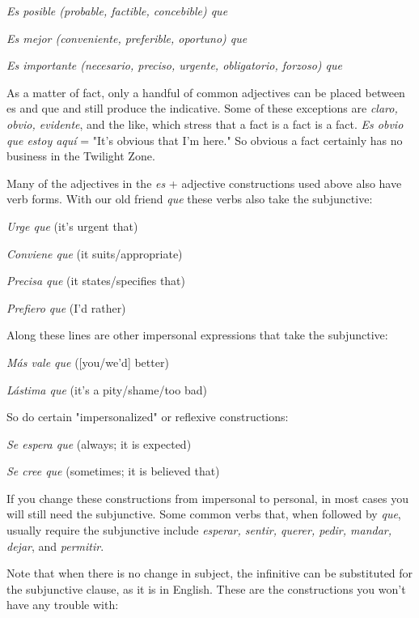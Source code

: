 \documentclass[14pt,a4paper,oneside]{memoir}
\newcommand{\bsk}{\vspace{20pt}}
\newcommand{\indu}{\hspace{20pt}}
\begin{document}
\bsk

\indu \emph{Es posible (probable, factible, concebible) que}

\indu \emph{Es mejor (conveniente, preferible, oportuno) que}

\indu \emph{Es importante (necesario, preciso, urgente, obligatorio,
	forzoso) que}

\bsk

As a matter of fact, only a handful of common adjectives can
be placed between es and que and still produce the indicative. Some of
these exceptions are \emph{claro, obvio, evidente}, and the like, which stress
that a fact is a fact is a fact. \emph{Es obvio que estoy aquí} = "It's obvious
that I'm here." So obvious a fact certainly has no business in the Twilight Zone.

Many of the adjectives in the \emph{es} + adjective constructions
used above also have verb forms. With our old friend \emph{que} these verbs
also take the subjunctive:

\bsk

\indu \emph{Urge que} (it's urgent that)

\indu \emph{Conviene que} (it suits/appropriate)

\indu \emph{Precisa que} (it states/specifies that)

\indu \emph{Prefiero que} (I'd rather)

\bsk

Along these lines are other impersonal expressions that take
the subjunctive:

\bsk

\indu \emph{Más vale que} ([you/we'd] better)

\indu \emph{Lástima que} (it's a pity/shame/too bad)

\bsk

So do certain "impersonalized" or reflexive constructions:

\bsk

\indu \emph{Se espera que} (always; it is expected)

\indu \emph{Se cree que} (sometimes; it is believed that)

\bsk

If you change these constructions from impersonal to personal, in
most cases you will still need the subjunctive. Some common verbs
that, when followed by \emph{que}, usually require the subjunctive include
\emph{esperar, sentir, querer, pedir, mandar, dejar}, and \emph{permitir}.

Note that when there is no change in subject, the infinitive
can be substituted for the subjunctive clause, as it is in English. These
are the constructions you won't have any trouble with:
\end{document}
